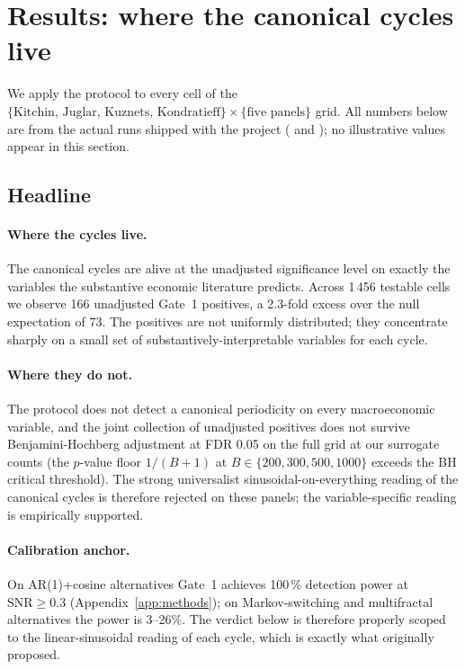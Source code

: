\section{Results: where the canonical cycles live}
\label{sec:results}

We apply the protocol to every cell of the
\(\{\text{Kitchin, Juglar, Kuznets, Kondratieff}\}\times\{\text{five panels}\}\)
grid. All numbers below are from the actual runs shipped with
the project ( and ); no
illustrative values appear in this section.

\subsection{Headline}

\paragraph{Where the cycles live.}
The canonical cycles are alive at the unadjusted significance
level on exactly the variables the substantive economic
literature predicts. Across 1\,456 testable cells we observe
166 unadjusted Gate~1 positives, a 2.3-fold excess over the
null expectation of 73. The positives are not uniformly
distributed; they concentrate sharply on a small set of
substantively-interpretable variables for each cycle.

\paragraph{Where they do not.}
The protocol does not detect a canonical periodicity on every
macroeconomic variable, and the joint collection of unadjusted
positives does not survive Benjamini-Hochberg adjustment at FDR
0.05 on the full grid at our surrogate counts (the
\(p\)-value floor \(1/(B+1)\) at \(B\in\{200,300,500,1000\}\)
exceeds the BH critical threshold). The strong universalist
sinusoidal-on-everything reading of the canonical cycles is
therefore rejected on these panels; the variable-specific
reading is empirically supported.

\paragraph{Calibration anchor.}
On AR(1)+cosine alternatives Gate~1 achieves 100\,\% detection
power at \(\mathrm{SNR}\geq 0.3\) (Appendix~\ref{app:methods});
on Markov-switching and multifractal alternatives the power is
3--26\%. The verdict below is therefore properly scoped to the
linear-sinusoidal reading of each cycle, which is exactly what
\citet{kitchin1923,juglar1862,kuznets1930,kondratieff1925}
originally proposed.

